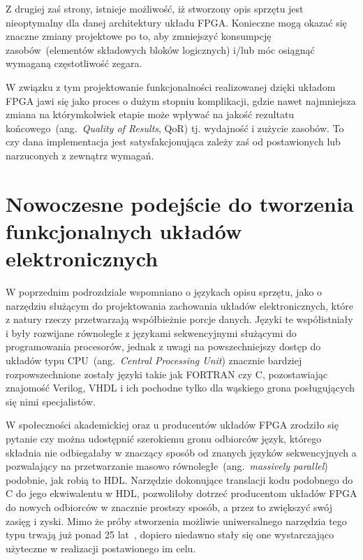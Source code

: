 Z drugiej zaś strony, istnieje możliwość, iż stworzony opis sprzętu jest nieoptymalny dla danej architektury układu FPGA. Konieczne mogą okazać się znaczne zmiany projektowe po to, aby zmniejszyć konsumpcję zasobów~(elementów składowych bloków logicznych) i/lub móc osiągnąć wymaganą częstotliwość zegara. 

W związku z tym projektowanie funkcjonalności realizowanej dzięki układom FPGA jawi się jako proces o dużym stopniu komplikacji, gdzie nawet najmniejsza zmiana na którymkolwiek etapie może wpływać na jakość rezultatu końcowego~(ang.~\textit{Quality of Results}, QoR) tj. wydajność i zużycie zasobów. To czy dana implementacja jest satysfakcjonująca zależy zaś od postawionych lub narzuconych z zewnątrz wymagań. 

\section{Nowoczesne podejście do tworzenia funkcjonalnych układów elektronicznych}
W poprzednim podrozdziale wspomniano o językach opisu sprzętu, jako o narzędziu służącym do projektowania zachowania układów elektronicznych, które z natury rzeczy przetwarzają współbieżnie porcje danych. Języki te współistniały i były rozwijane równolegle z językami sekwencyjnymi służącymi do programowania procesorów, jednak z uwagi na powszechniejszy dostęp do układów typu CPU~(ang.~\textit{Central Processing Unit}) znacznie bardziej rozpowszechnione zostały języki takie jak FORTRAN czy C, pozostawiając znajomość Verilog, VHDL i ich pochodne tylko dla wąskiego grona posługujących się nimi specjalistów.

W społeczności akademickiej oraz u producentów układów FPGA zrodziło się pytanie czy można udostępnić szerokiemu gronu odbiorców język, którego składnia nie odbiegałaby w znaczący sposób od znanych języków sekwencyjnych a pozwalający na przetwarzanie masowo równoległe~(ang.~\textit{massively parallel}) podobnie, jak robią to HDL. Narzędzie dokonujące translacji kodu podobnego do C do jego ekwiwalentu w HDL, pozwoliłoby dotrzeć producentom układów FPGA do nowych odbiorców w znacznie prostszy sposób, a przez to zwiększyć swój zasięg i zyski. Mimo że próby stworzenia możliwie uniwersalnego narzędzia tego typu trwają już ponad 25 lat~\cite{C_VHDL}, dopiero niedawno stały się one wystarczająco użyteczne w realizacji postawionego im celu. 

